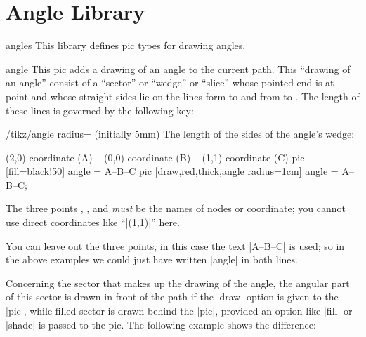 %
%
%


\section{Angle Library}

\label{section-angle}

\begin{tikzlibrary}{angles}
  This library defines pic types for drawing angles.
\end{tikzlibrary}

\begin{pictype}{angle}{}
  This pic adds a drawing of an angle to the current path. This
  ``drawing of an angle'' consist of a ``sector'' or ``wedge'' or
  ``slice'' whose pointed end is at point  and whose straight
  sides lie on the lines form  to  and from 
  to . The length of these lines is governed by the following
  key:
  \begin{key}{/tikz/angle radius= (initially 5mm)}
    The length of the sides of the angle's wedge:
\begin{codeexample}[]
\tikz \draw (2,0) coordinate (A) -- (0,0) coordinate (B)
         -- (1,1) coordinate (C)
           pic [fill=black!50]                   {angle = A--B--C}
           pic [draw,red,thick,angle radius=1cm] {angle = A--B--C};
\end{codeexample}
  \end{key}

  The three points , , and  \emph{must} be the
  names of nodes or coordinate; you cannot use direct coordinates like
  ``|(1,1)|'' here.

  You can leave out the three points, in this case the text |A--B--C|
  is used; so in the above examples we could just have written
  |{angle}| in both lines.

  Concerning the sector that makes up the drawing of the angle, the
  angular part of this sector is drawn in front of the path if the
  |draw| option is given to the |pic|, while filled sector is drawn
  behind the |pic|, provided an option like |fill| or |shade| is
  passed to the pic. The following example shows the difference:


\end{pictype}
